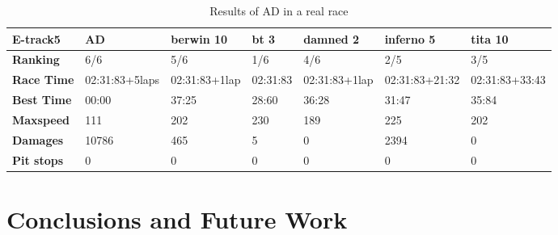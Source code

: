 \documentclass[runningheads,a4paper]{llncs}
\begin{document}
\begin{table}[!ht]
	\caption{Results of AD in a real race}
	\label{16}
	\begin{tabular}{|p{2.3 cm}|p{1.75 cm}|p{1.75 cm}|p{1.75 cm}|p{1.75 cm}|p{1.75 cm}|p{1.75 cm}|}
		\hline \textbf{E-track5} & \textbf{AD} & \textbf{berwin 10} & \textbf{bt 3} &\textbf{damned 2} & \textbf{inferno 5} & \textbf{tita 10}  \\
		\hline \textbf{Ranking} & 6/6&5/6&1/6&4/6&2/5&3/5\\			
		\hline \textbf{Race Time}	& 02:31:83\newline+5laps&02:31:83\newline+1lap&02:31:83&02:31:83\newline+1lap&02:31:83\newline+21:32&02:31:83\newline+33:43 \\	
		\hline \textbf{Best Time}& 00:00&37:25&28:60&36:28&31:47&35:84\\	
		\hline \textbf{Maxspeed}& 111&202&230&189&225&202\\	
		\hline \textbf{Damages}& 10786&465&5&0&2394&0 \\	
		\hline \textbf{Pit stops} & 0&0&0&0&0&0\\ 
		\hline 
	\end{tabular}
\end{table}



	\section{Conclusions and Future Work} 
\label{sec:conclusions}
\newpage
	
	
	
	
	
	
	
	
\end{document}
